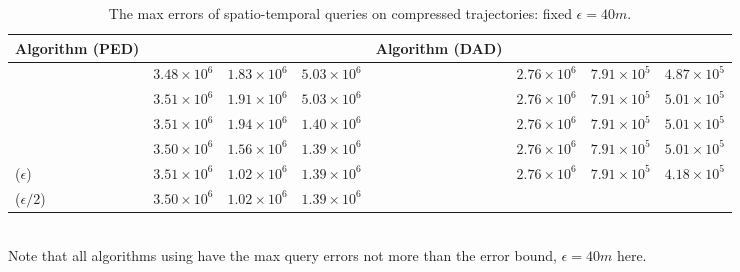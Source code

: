 \begin{table}
	\vspace{-1ex}
	\caption{\small The max errors of spatio-temporal queries on compressed trajectories: fixed $\epsilon=40m$.}
	\centering
	\scriptsize
	\begin{tabular}{|l|c|c|c|l|c|c|c|}
		\hline
		\bf{Algorithm (PED)}  &\ucar &\geolife &\mopsi & \bf{Algorithm (DAD)}  &\ucar &\geolife &\mopsi \\
		\hline
		{\dpa} &	$3.48 \times 10^6$ & $1.83 \times 10^6$ &	$5.03 \times 10^6$	& \dpa	& $2.76 \times 10^6$	& $7.91 \times 10^5$	& $4.87 \times 10^5$ \\
		\hline
		{\tpa} &	$3.51 \times 10^6$ & $1.91 \times 10^6$ &	$5.03 \times 10^6$	& \tpa	& $2.76 \times 10^6$	& $7.91 \times 10^5$	& $5.01 \times 10^5$ \\
		\hline
		{\bqsa} &	$3.51 \times 10^6$ & $1.94 \times 10^6$ &	$1.40 \times 10^6$	& \opwa	& $2.76 \times 10^6$	& $7.91 \times 10^5$	& $5.01 \times 10^5$ \\
		\hline
		{\operb} &	$3.50 \times 10^6$ & $1.56 \times 10^6$ &	$1.39 \times 10^6$	& \interval	& $2.76 \times 10^6$	& $7.91 \times 10^5$	& $5.01 \times 10^5$ \\
		\hline
		{\siped($\epsilon$)} &	$3.51 \times 10^6$ & $1.02 \times 10^6$ &	$1.39 \times 10^6$	& \intersec	& $2.76 \times 10^6$	& $7.91 \times 10^5$	& $4.18 \times 10^5$ \\
		\hline
		{\siped($\epsilon/2$)} &	$3.50 \times 10^6$ & $1.02 \times 10^6$ &	$1.39 \times 10^6$	& & & & \\
		\hline
	\end{tabular}
	\label{tab:query-me}
	\vspace{0.5ex}
	\\{Note that all algorithms using \sed have the max query errors not more than the error bound, \ie $\epsilon=40m$ here.}
	\vspace{-2ex}
\end{table}


